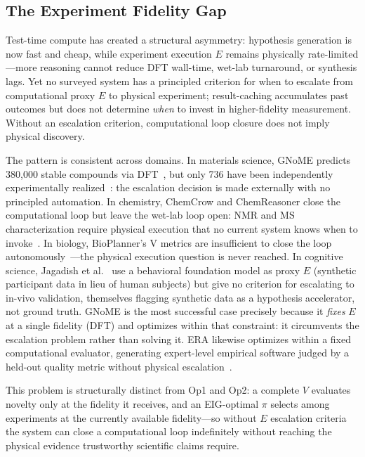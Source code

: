 \documentclass{article}
\begin{document}
\subsection{The Experiment Fidelity Gap}
\label{sec:op3}

Test-time compute has created a structural asymmetry: hypothesis generation is now fast and cheap, while experiment execution $E$ remains physically rate-limited---more reasoning cannot reduce DFT wall-time, wet-lab turnaround, or synthesis lags. Yet no surveyed system has a principled criterion for when to escalate from computational proxy $E$ to physical experiment; result-caching accumulates past outcomes but does not determine \emph{when} to invest in higher-fidelity measurement. Without an escalation criterion, computational loop closure does not imply physical discovery.

The pattern is consistent across domains. In materials science, GNoME predicts 380,000 stable compounds via DFT~\citep{merchant2023gnome}, but only 736 have been independently experimentally realized~\citep{merchant2023gnome}: the escalation decision is made externally with no principled automation. In chemistry, ChemCrow and ChemReasoner close the computational loop but leave the wet-lab loop open: NMR and MS characterization require physical execution that no current system knows when to invoke~\citep{gromski2019chemical}. In biology, BioPlanner's V metrics are insufficient to close the loop autonomously~\citep{odonoghue2023bioplanner}---the physical execution question is never reached. In cognitive science, Jagadish et al.~\citep{jagadish2026automatize} use a behavioral foundation model as proxy $E$ (synthetic participant data in lieu of human subjects) but give no criterion for escalating to in-vivo validation, themselves flagging synthetic data as a hypothesis accelerator, not ground truth. GNoME is the most successful case precisely because it \emph{fixes} $E$ at a single fidelity (DFT) and optimizes within that constraint: it circumvents the escalation problem rather than solving it. ERA likewise optimizes within a fixed computational evaluator, generating expert-level empirical software judged by a held-out quality metric without physical escalation~\citep{aygun2026era}.

This problem is structurally distinct from Op1 and Op2: a complete $V$ evaluates novelty only at the fidelity it receives, and an EIG-optimal $\pi$ selects among experiments at the currently available fidelity---so without $E$ escalation criteria the system can close a computational loop indefinitely without reaching the physical evidence trustworthy scientific claims require.
\end{document}
